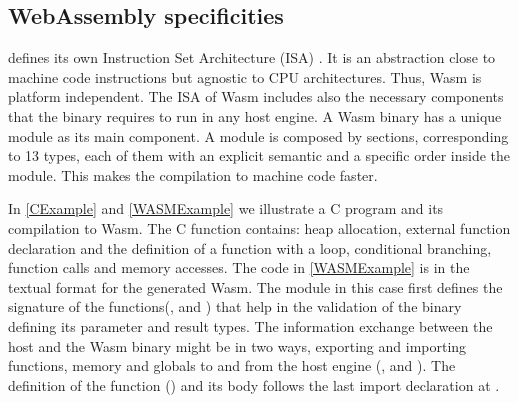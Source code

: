 







\subsection*{WebAssembly specificities}

\wasm defines its own Instruction Set Architecture (ISA) \cite{wasm_spec}. It is an abstraction close to machine code instructions but agnostic to CPU architectures. Thus, Wasm is platform independent. The ISA of Wasm includes also the necessary components that the binary requires to run in any host engine. 
A Wasm binary has a unique module as its main component. A module is composed by sections, corresponding to 13 types, each of them with an explicit semantic and a specific order inside the module. This makes the compilation to machine code faster. %


In \autoref{CExample} and \autoref{WASMExample} we illustrate a C program and its compilation to Wasm. The C function contains: heap allocation, external function declaration and the definition of a function with a loop, conditional branching, function calls and memory accesses. The code in \autoref{WASMExample} is in the textual format for the generated Wasm. The module in this case first defines the signature of the functions(,   and  )  that help in the validation of the binary defining its parameter and result types. The information exchange between the host and the Wasm binary might be in two ways, exporting and importing functions, memory and globals to and from the host engine (,  and ). The definition of the function () and its body follows the last import declaration at . 

